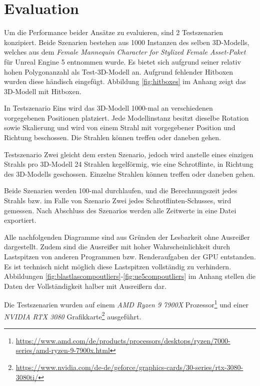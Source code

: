 \documentclass[11pt]{scrartcl}
\begin{document}
	\pagebreak
	\section{Evaluation}
	
	Um die Performance beider Ansätze zu evaluieren, sind 2 Testszenarien konzipiert. Beide Szenarien bestehen aus 1000 Instanzen des selben 3D-Modells, welches aus dem \textit{Female Mannequin Character for Stylized Female Asset-Paket} für Unreal Engine 5 entnommen wurde\cite{Poart2017}. Es bietet sich aufgrund seiner relativ hohen Polygonanzahl als Test-3D-Modell an. Aufgrund fehlender Hitboxen wurden diese händisch eingefügt. Abbildung \ref{fig:hitboxes} im Anhang zeigt das 3D-Modell mit Hitboxen.
	
	In Testszenario Eins wird das 3D-Modell 1000-mal an verschiedenen vorgegebenen Positionen platziert. Jede Modellinstanz besitzt dieselbe Rotation sowie Skalierung und wird von einem Strahl mit vorgegebener Position und Richtung beschossen. Die Strahlen können treffen oder daneben gehen.
	
	Testszenario Zwei gleicht dem ersten Szenario, jedoch wird anstelle eines einzigen Strahls pro 3D-Modell 24 Strahlen kegelförmig, wie eine Schrotflinte, in Richtung des 3D-Modells geschossen. Einzelne Strahlen können treffen oder daneben gehen.

	Beide Szenarien werden 100-mal durchlaufen, und die Berechnungszeit jedes Strahls bzw. im Falle von Szenario Zwei jedes Schrotflinten-Schusses, wird gemessen. Nach Abschluss des Szenarios werden alle Zeitwerte in eine Datei exportiert.
	
	Alle nachfolgenden Diagramme sind aus Gründen der Lesbarkeit ohne Ausreißer dargestellt. Zudem sind die Ausreißer mit hoher Wahrscheinlichkeit durch Lastspitzen von anderen Programmen bzw. Renderaufgaben der GPU entstanden. Es ist technisch nicht möglich diese Lastspitzen vollständig zu verhindern. Abbildungen \ref{fig:blastlascompoutliers}-\ref{fig:ue5compoutliers} im Anhang stellen die Daten der Vollständigkeit halber mit Ausreißern dar. 
	
	Die Testszenarien wurden auf einem \textit{AMD Ryzen 9 7900X} Prozessor\footnote{\url{https://www.amd.com/de/products/processors/desktops/ryzen/7000-series/amd-ryzen-9-7900x.html}} und einer \textit{NVIDIA RTX 3080} Grafikkarte\footnote{\url{https://www.nvidia.com/de-de/geforce/graphics-cards/30-series/rtx-3080-3080ti/}} ausgeführt.
	
\end{document}
